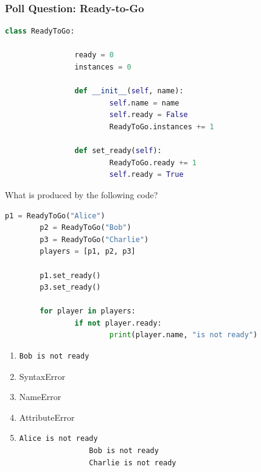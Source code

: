 \documentclass{beamer}
\begin{document}
%
%
%
\begin{frame}[fragile]
	\frametitle{Poll Question: Ready-to-Go}
	\begin{minipage}{0.69\textwidth}
		\begin{lstlisting}[language=Python, autogobble, basicstyle=\tiny]
		class ReadyToGo:

				ready = 0
				instances = 0

				def __init__(self, name):
						self.name = name
						self.ready = False
						ReadyToGo.instances += 1

				def set_ready(self):
						ReadyToGo.ready += 1
						self.ready = True
		\end{lstlisting}
		\pause
		\vspace{0.1cm}
		What is produced by the following code?
		\vfill
		\begin{lstlisting}[language=Python, autogobble, basicstyle=\tiny]
		p1 = ReadyToGo("Alice")
		p2 = ReadyToGo("Bob")
		p3 = ReadyToGo("Charlie")
		players = [p1, p2, p3]

		p1.set_ready()
		p3.set_ready()

		for player in players:
				if not player.ready:
						print(player.name, "is not ready")
		\end{lstlisting}
	\end{minipage}
	\hfill
	\begin{minipage}{0.29\textwidth}
		\begin{enumerate}[A]
			\item 
				\begin{lstlisting}[autogobble, basicstyle=\tiny]
				Bob is not ready
				\end{lstlisting}
			\item SyntaxError
			\item NameError
			\item AttributeError
			\item 
				\begin{lstlisting}[autogobble, basicstyle=\tiny]
				Alice is not ready
				Bob is not ready
				Charlie is not ready
				\end{lstlisting}
		\end{enumerate}
	\end{minipage}
\end{frame}
\end{document}
